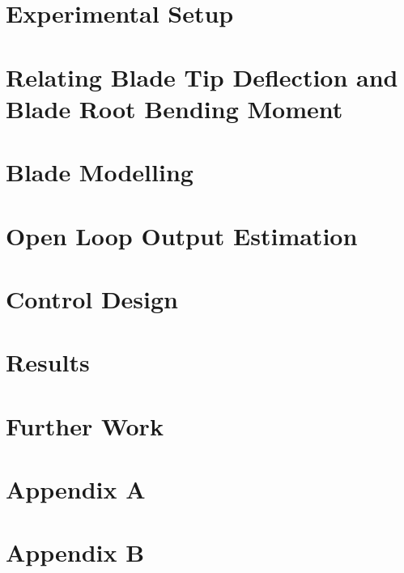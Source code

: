 \section{Experimental Setup}


\pagebreak
\section{Relating Blade Tip Deflection and Blade Root Bending Moment}



\pagebreak
\section{Blade Modelling}


\pagebreak
\section{Open Loop Output Estimation}


\pagebreak
\section{Control Design}



\section{Results}

\pagebreak

\section{Further Work}

\pagebreak







\pagebreak
\section{Appendix A}


\section{Appendix B}


